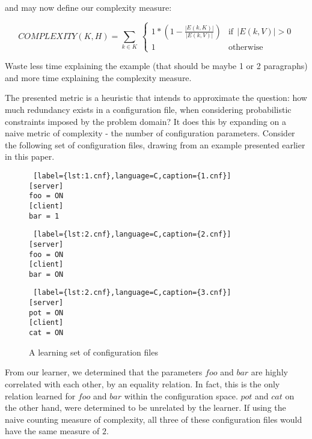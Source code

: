 and may now define our complexity measure:

\begin{equation}
    COMPLEXITY(K, H) = \sum_{k \in K} \
        \begin{cases}
            1 * (1 - \frac{|E(k, K)|}{|E(k, V)|}) & \text{if}\ \ |E(k, V)| > 0 \\
            1 & \text{otherwise}
        \end{cases}
\end{equation}

Waste less time explaining the example (that should be maybe 1 or 2 paragraphs) and more time explaining the complexity measure.
\para {Semantics}

The presented metric is a heuristic that intends to approximate the question: 
how much redundancy exists in a configuration file, when considering
probabilistic constraints imposed by the problem domain? It does this by
expanding on a naive metric of complexity - the number of configuration 
parameters. Consider the following set of configuration files, drawing from
an example presented earlier in this paper.

\begin{figure}[!htb]
    \centering
    \begin{minipage}{.25\textwidth}
    \begin{lstlisting} [label={lst:1.cnf},language=C,caption={1.cnf}]
[server]
foo = ON
[client]
bar = 1
    \end{lstlisting}
    \end{minipage}%
    \hspace{1cm}
    \begin{minipage}{0.25\textwidth}
    \begin{lstlisting} [label={lst:2.cnf},language=C,caption={2.cnf}]
[server]
foo = ON
[client]
bar = ON
    \end{lstlisting}
    \end{minipage}
    \hspace{1cm}
    \begin{minipage}{0.25\textwidth}
    \begin{lstlisting} [label={lst:2.cnf},language=C,caption={3.cnf}]
[server]
pot = ON
[client]
cat = ON
    \end{lstlisting}
    \end{minipage}
    \caption{A learning set of configuration files}
    \label{fig:complexityset}
\end{figure}

From our learner, we determined that the parameters $foo$ and $bar$ are
highly correlated with each other, by an equality relation. In fact, this
is the only relation learned for $foo$ and $bar$ within the configuration
space. $pot$ and $cat$ on the other hand, were determined to be unrelated
by the learner. If using the naive counting measure of complexity, all 
three of these configuration files would have the same measure of $2$.

